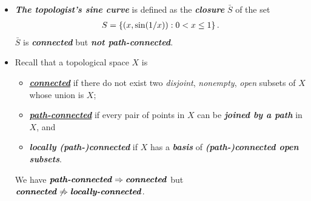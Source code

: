 \documentclass[11pt]{article}
\begin{document}
\begin{itemize}
\item \begin{example} 
\emph{\textbf{The topologist's sine curve}} is defined as the \emph{\textbf{closure}} $\bar{S}$ of the set
\begin{align*}
S = \left\{(x, \sin(1/x)): 0 < x \le 1\right\}.
\end{align*} $\bar{S}$ is \emph{\textbf{connected}} but \emph{\textbf{not path-connected}}.
\end{example}

\item \begin{remark}
Recall that a topological space $X$ is
\begin{itemize}
\item \underline{\emph{\textbf{connected}}} if there do not exist two \emph{disjoint}, \emph{nonempty}, \emph{open} subsets of $X$ whose union is $X$;
\item \underline{\emph{\textbf{path-connected}}} if every pair of points in $X$ can be \emph{\textbf{joined by a path}} in $X$, and
\item \emph{\textbf{locally (path-)connected}} if $X$ has a \emph{\textbf{basis}} of \emph{\textbf{(path-)connected open subsets}}.
\end{itemize}
We have $\text{\emph{\textbf{path-connected}}} \Rightarrow \text{\emph{\textbf{connected}}}$ but $\text{\emph{\textbf{connected}}} \not\Rightarrow \text{\emph{\textbf{locally-connected}}}$.
\end{remark}
\end{itemize}
\end{document}
